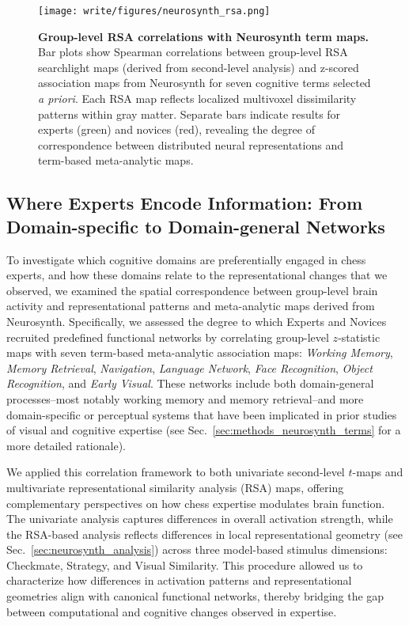 \documentclass[preprint,12pt]{elsarticle}
\begin{document}
\begin{figure}[!htp]
  \centering
  \texttt{[image: write/figures/neurosynth\_rsa.png]}
  \caption{
    \textbf{Group-level RSA correlations with Neurosynth term maps.} Bar plots show Spearman correlations between group-level RSA searchlight maps (derived from second-level analysis) and z-scored association maps from Neurosynth for seven cognitive terms selected \emph{a priori}. Each RSA map reflects localized multivoxel dissimilarity patterns within gray matter. Separate bars indicate results for experts (green) and novices (red), revealing the degree of correspondence between distributed neural representations and term-based meta-analytic maps.
  }
  \label{fig:neurosynth_rsa}
\end{figure}

\subsection{Where Experts Encode Information: From Domain-specific to Domain-general Networks}

To investigate which cognitive domains are preferentially engaged in chess experts, and how these domains relate to the representational changes that we observed, we examined the spatial correspondence between group-level brain activity and representational patterns and meta-analytic maps derived from Neurosynth. Specifically, we assessed the degree to which Experts and Novices recruited predefined functional networks by correlating group-level $z$-statistic maps with seven term-based meta-analytic association maps: \emph{Working Memory}, \emph{Memory Retrieval}, \emph{Navigation}, \emph{Language Network}, \emph{Face Recognition}, \emph{Object Recognition}, and \emph{Early Visual}. These networks include both domain-general processes--most notably working memory and memory retrieval--and more domain-specific or perceptual systems that have been implicated in prior studies of visual and cognitive expertise (see Sec.~\ref{sec:methods_neurosynth_terms} for a more detailed rationale).

We applied this correlation framework to both univariate second-level $t$-maps and multivariate representational similarity analysis (RSA) maps, offering complementary perspectives on how chess expertise modulates brain function. The univariate analysis captures differences in overall activation strength, while the RSA-based analysis reflects differences in local representational geometry (see Sec.~\ref{sec:neurosynth_analysis}) across three model-based stimulus dimensions: Checkmate, Strategy, and Visual Similarity. This procedure allowed us to characterize how differences in activation patterns and representational geometries align with canonical functional networks, thereby bridging the gap between computational and cognitive changes observed in expertise.
\end{document}
